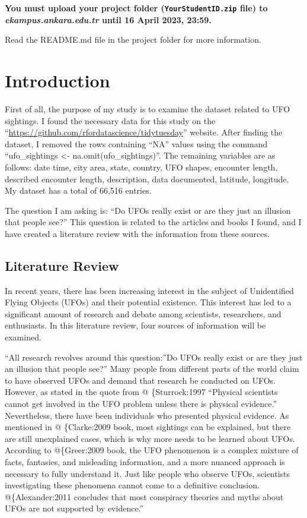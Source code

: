 \documentclass[
]{article}
\begin{document}
\textbf{You must upload your project folder (\texttt{YourStudentID.zip} file) to \emph{ekampus.ankara.edu.tr} until 16 April 2023, 23:59.}

\colorbox{WildStrawberry}{Read the README.md file in the project folder for more information.}

\hypertarget{introduction}{%
\section{Introduction}\label{introduction}}

First of all, the purpose of my study is to examine the dataset related to UFO sightings. I found the necessary data for this study on the ``\url{https://github.com/rfordatascience/tidytuesday}'' website. After finding the dataset, I removed the rows containing ``NA'' values using the command ``ufo\_sightings \textless- na.omit(ufo\_sightings)''. The remaining variables are as follows: date time, city area, state, country, UFO shapes, encounter length, described encounter length, description, data documented, latitude, longitude. My dataset has a total of 66,516 entries.

The question I am asking is: ``Do UFOs really exist or are they just an illusion that people see?'' This question is related to the articles and books I found, and I have created a literature review with the information from these sources.

\hypertarget{literature-review}{%
\subsection{Literature Review}\label{literature-review}}

In recent years, there has been increasing interest in the subject of Unidentified Flying Objects (UFOs) and their potential existence. This interest has led to a significant amount of research and debate among scientists, researchers, and enthusiasts. In this literature review, four sources of information will be examined.

``All research revolves around this question:''Do UFOs really exist or are they just an illusion that people see?'' Many people from different parts of the world claim to have observed UFOs and demand that research be conducted on UFOs. However, as stated in the quote from @ \{Sturrock:1997 ``Physical scientists cannot get involved in the UFO problem unless there is physical evidence.'' Nevertheless, there have been individuals who presented physical evidence. As mentioned in @ \{Clarke:2009 book, most sightings can be explained, but there are still unexplained cases, which is why more needs to be learned about UFOs. According to @\{Greer:2009 book, the UFO phenomenon is a complex mixture of facts, fantasies, and misleading information, and a more nuanced approach is necessary to fully understand it. Just like people who observe UFOs, scientists investigating these phenomena cannot come to a definitive conclusion. @\{Alexander:2011 concludes that most conspiracy theories and myths about UFOs are not supported by evidence.''
\end{document}
